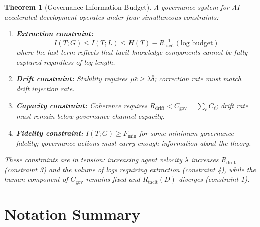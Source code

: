 \documentclass[11pt, a4paper, copyright]{googledeepmind}
\newtheorem{theorem}{Theorem}[section]
\begin{document}
\begin{theorem}[Governance Information Budget]
A governance system for AI-accelerated development operates under four simultaneous constraints:

\begin{enumerate}
    \item \textbf{Extraction constraint:}
    \begin{equation}
        I(T; G) \leq I(T; L) \leq H(T) - R_{\mathrm{tacit}}^{-1}(\text{log budget})
    \end{equation}
    where the last term reflects that tacit knowledge components cannot be fully captured regardless of log length.

    \item \textbf{Drift constraint:} Stability requires $\mu \bar{c} \geq \lambda \bar{\delta}$; correction rate must match drift injection rate.

    \item \textbf{Capacity constraint:} Coherence requires $R_{\mathrm{drift}} < C_{\mathrm{gov}} = \sum_\ell C_\ell$; drift rate must remain below governance channel capacity.

    \item \textbf{Fidelity constraint:} $I(T; G) \geq F_{\min}$ for some minimum governance fidelity; governance actions must carry enough information about the theory.
\end{enumerate}

These constraints are in tension: increasing agent velocity $\lambda$ increases $R_{\mathrm{drift}}$ (constraint 3) and the volume of logs requiring extraction (constraint 4), while the human component of $C_{\mathrm{gov}}$ remains fixed and $R_{\mathrm{tacit}}(D)$ diverges (constraint 1).
\end{theorem}

\section{Notation Summary}
\label{app:notation}
\end{document}
